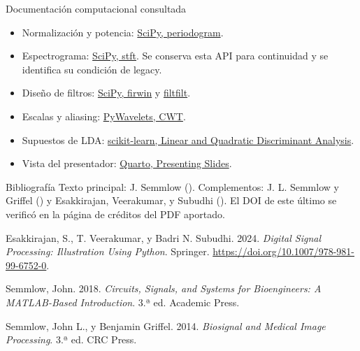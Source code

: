 \documentclass[
  10pt,
  ignorenonframetext,
  aspectratio=169,
  spanish,
]{beamer}
\newlength{\cslhangindent}
\newenvironment{CSLReferences}[2] %
 {\begin{list}{}{%
  \setlength{\itemindent}{0pt}
  \setlength{\leftmargin}{0pt}
  \setlength{\parsep}{0pt}
  \ifodd #1
   \setlength{\leftmargin}{\cslhangindent}
   \setlength{\itemindent}{-1\cslhangindent}
  \fi
  \setlength{\itemsep}{#2\baselineskip}}}
 {\end{list}}
\providecommand{\tightlist}{%
  \setlength{\itemsep}{0pt}\setlength{\parskip}{0pt}}
\begin{document}
\begin{frame}{Documentación computacional consultada}
\label{documentaciuxf3n-computacional-consultada}
\begin{itemize}
\tightlist
\item
  Normalización y potencia:
  \href{https://docs.scipy.org/doc/scipy/reference/generated/scipy.signal.periodogram.html}{SciPy,
  periodogram}.
\item
  Espectrograma:
  \href{https://docs.scipy.org/doc/scipy/reference/generated/scipy.signal.stft.html}{SciPy,
  stft}. Se conserva esta API para continuidad y se identifica su
  condición de legacy.
\item
  Diseño de filtros:
  \href{https://docs.scipy.org/doc/scipy/reference/generated/scipy.signal.firwin.html}{SciPy,
  firwin} y
  \href{https://docs.scipy.org/doc/scipy/reference/generated/scipy.signal.filtfilt.html}{filtfilt}.
\item
  Escalas y aliasing:
  \href{https://pywavelets.readthedocs.io/en/latest/ref/cwt.html}{PyWavelets,
  CWT}.
\item
  Supuestos de LDA:
  \href{https://scikit-learn.org/stable/modules/lda_qda.html}{scikit-learn,
  Linear and Quadratic Discriminant Analysis}.
\item
  Vista del presentador:
  \href{https://quarto.org/docs/presentations/revealjs/presenting.html}{Quarto,
  Presenting Slides}.
\end{itemize}
\end{frame}

\begin{frame}{Bibliografía}
\label{bibliografuxeda}
Texto principal: J. Semmlow ().
Complementos: J. L. Semmlow y Griffel
() y Esakkirajan, Veerakumar, y
Subudhi (). El DOI de este último se
verificó en la página de créditos del PDF aportado.

\label{refs}
\begin{CSLReferences}{1}{0}
Esakkirajan, S., T. Veerakumar, y Badri N. Subudhi. 2024. \emph{Digital
Signal Processing: Illustration Using Python}. Springer.
\url{https://doi.org/10.1007/978-981-99-6752-0}.

Semmlow, John. 2018. \emph{Circuits, Signals, and Systems for
Bioengineers: A MATLAB-Based Introduction}. 3.ª ed. Academic Press.

Semmlow, John L., y Benjamin Griffel. 2014. \emph{Biosignal and Medical
Image Processing}. 3.ª ed. CRC Press.

\end{CSLReferences}
\end{frame}
\end{document}
